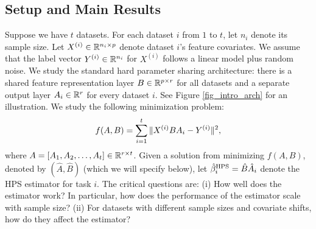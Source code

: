 \subsection{Setup and Main Results}

Suppose we have $t$ datasets.
For each dataset $i$ from $1$ to $t$, let $n_i$ denote its sample size.
Let $X^{(i)} \in \mathbb{R}^{n_i \times p}$ denote dataset $i$'s feature covariates.
We assume that the label vector $Y^{(i)} \in \mathbb{R}^{n_i}$ for $X^{(i)}$ follows a linear model plus random noise.
We study the standard hard parameter sharing architecture:
there is a shared feature representation layer $B\in\mathbb{R}^{p\times r}$ for all datasets and a separate output layer $A_i \in \mathbb{R}^r$ for every dataset $i$.
See Figure \ref{fig_intro_arch} for an illustration.
We study the following minimization problem:
\begin{align}\label{eq_mtl}
			f(A, B) = \sum_{i=1}^t \|X^{(i)} B A_i - Y^{(i)}\|^2,
\end{align}
where $A = [A_1, A_2, \dots, A_t] \in \mathbb{R}^{r \times t}$.
Given a solution from minimizing $f(A, B)$, denoted by $(\hat{A}, \hat{B})$  (which we will specify below), let $\hat{\beta}_i^{\textup{HPS}} = \hat{B} \hat{A}_i$ denote the HPS estimator for task $i$.
The critical questions are:
(i) How well does the estimator work? In particular, how does the performance of the estimator scale with sample size?
(ii) For datasets with different sample sizes and covariate shifts, how do they affect the estimator?


